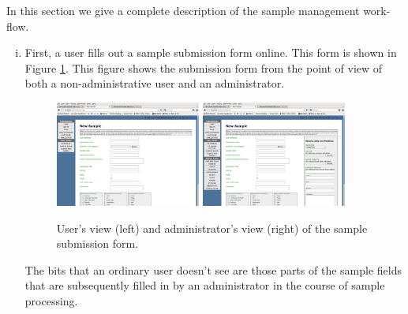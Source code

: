 \documentclass[12pt,twoside]{article}
\begin{document}
In this section we give a complete description of the sample management
work-flow.
\begin{enumerate}[(i)]
\item
First, a user fills out a sample submission form online. This form is
shown in Figure \ref{fig:sampleform}. This figure shows the
submission form from the point of view of both a non-administrative user
and an administrator.
\begin{figure}[!htb]
\begin{center}
\includegraphics[width=0.45\textwidth]{sampleformuser}
\quad
\includegraphics[width=0.45\textwidth]{sampleformadmin}
\caption{User's view (left) and administrator's view (right)
of the sample submission form.\label{fig:sampleform}}
\end{center}
\end{figure}

The bits that an ordinary user doesn't see are those parts of the sample
fields that are subsequently filled in by an administrator in the course
of sample processing.


\end{enumerate}
\end{document}
